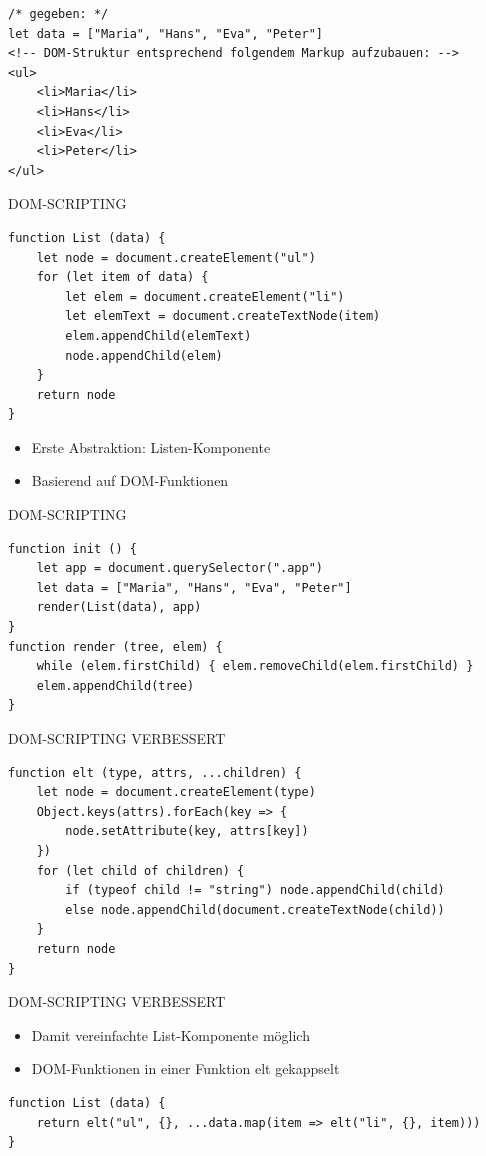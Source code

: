\begin{verbatim}
/* gegeben: */
let data = ["Maria", "Hans", "Eva", "Peter"]
<!-- DOM-Struktur entsprechend folgendem Markup aufzubauen: -->
<ul>
    <li>Maria</li>
    <li>Hans</li>
    <li>Eva</li>
    <li>Peter</li>
</ul>
\end{verbatim}

\begin{definition}{DOM-SCRIPTING}
\begin{verbatim}
function List (data) {
    let node = document.createElement("ul")
    for (let item of data) {
        let elem = document.createElement("li")
        let elemText = document.createTextNode(item)
        elem.appendChild(elemText)
        node.appendChild(elem)
    }
    return node
}
\end{verbatim}
\end{definition}

\begin{itemize}
  \item Erste Abstraktion: Listen-Komponente
  \item Basierend auf DOM-Funktionen
\end{itemize}

\begin{definition}{DOM-SCRIPTING}
\begin{verbatim}
function init () {
    let app = document.querySelector(".app")
    let data = ["Maria", "Hans", "Eva", "Peter"]
    render(List(data), app)
}
function render (tree, elem) {
    while (elem.firstChild) { elem.removeChild(elem.firstChild) }
    elem.appendChild(tree)
}
\end{verbatim}
\end{definition}

\begin{definition}{DOM-SCRIPTING VERBESSERT}
\begin{verbatim}
function elt (type, attrs, ...children) {
    let node = document.createElement(type)
    Object.keys(attrs).forEach(key => {
        node.setAttribute(key, attrs[key])
    })
    for (let child of children) {
        if (typeof child != "string") node.appendChild(child)
        else node.appendChild(document.createTextNode(child))
    }
    return node
}
\end{verbatim}
\end{definition}

\begin{definition}{DOM-SCRIPTING VERBESSERT}
\begin{itemize}
  \item Damit vereinfachte List-Komponente möglich
  \item DOM-Funktionen in einer Funktion elt gekappselt
\end{itemize}

\begin{verbatim}
function List (data) {
    return elt("ul", {}, ...data.map(item => elt("li", {}, item)))
}
\end{verbatim}
\end{definition}


